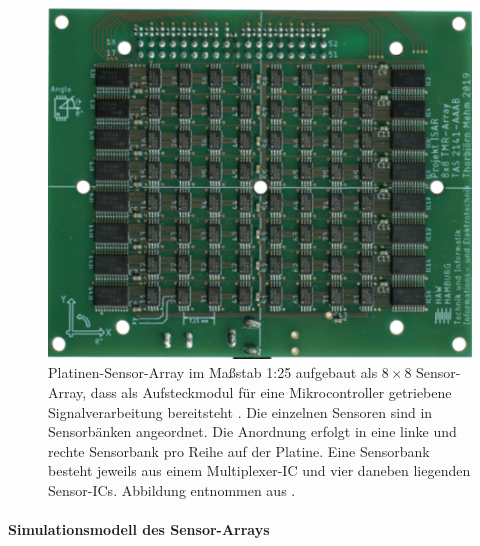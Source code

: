 \begin{figure}[tph]
	\centering
	\includegraphics[width=0.5\linewidth]{chapters/images/1-Motivation/Sensor-Array-Platine-8x8}
	\caption[Platinen-Sensor-Array im Maßstab 1:25]{Platinen-Sensor-Array im Maßstab 1:25 aufgebaut als $8\times8$ 
		Sensor-Array, dass als Aufsteckmodul für eine Mikrocontroller getriebene Signalverarbeitung bereitsteht 
		\cite{Mehm2019}. Die einzelnen Sensoren sind in Sensorbänken angeordnet. Die Anordnung erfolgt in eine linke 
		und 
		rechte Sensorbank pro Reihe auf der Platine. Eine Sensorbank besteht jeweils aus einem Multiplexer-IC und vier 
		daneben liegenden Sensor-ICs. Abbildung entnommen aus \cite{Mehm2019}.}
	\label{fig:sensor-array-platine-8x8}
\end{figure}


\paragraph{Simulationsmodell des Sensor-Arrays}\label{par:simulationsmodell-des-sensor-arrays}$~$\\


